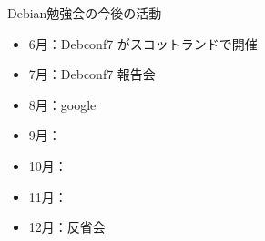 \documentclass[cjk,dvipdfmx,12pt]{beamer}
\begin{document}
\begin{frame}{Debian勉強会の今後の活動}
\begin{itemize}
 \item 6月：Debconf7 がスコットランドで開催
 \item 7月：Debconf7 報告会
 \item 8月：google 
 \item 9月：
 \item 10月：
 \item 11月：
 \item 12月：反省会
\end{itemize}
 
\end{frame}
\end{document}
